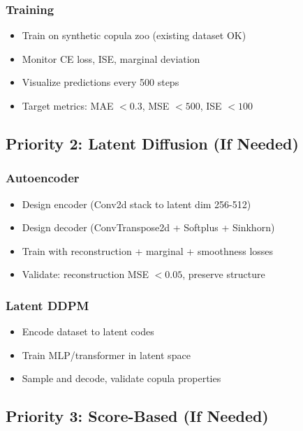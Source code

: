 \documentclass[11pt]{article}
\begin{document}
\subsubsection{Training}
\begin{itemize}
    \item[$\square$] Train on synthetic copula zoo (existing dataset OK)
    \item[$\square$] Monitor CE loss, ISE, marginal deviation
    \item[$\square$] Visualize predictions every 500 steps
    \item[$\square$] Target metrics: MAE $< 0.3$, MSE $< 500$, ISE $< 100$
\end{itemize}

\subsection{Priority 2: Latent Diffusion (If Needed)}

\subsubsection{Autoencoder}
\begin{itemize}
    \item[$\square$] Design encoder (Conv2d stack to latent dim 256-512)
    \item[$\square$] Design decoder (ConvTranspose2d + Softplus + Sinkhorn)
    \item[$\square$] Train with reconstruction + marginal + smoothness losses
    \item[$\square$] Validate: reconstruction MSE $< 0.05$, preserve structure
\end{itemize}

\subsubsection{Latent DDPM}
\begin{itemize}
    \item[$\square$] Encode dataset to latent codes
    \item[$\square$] Train MLP/transformer in latent space
    \item[$\square$] Sample and decode, validate copula properties
\end{itemize}

\subsection{Priority 3: Score-Based (If Needed)}
\end{document}
